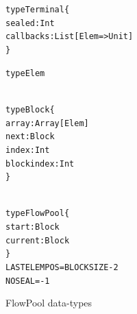 \documentclass[runningheads,a4paper]{llncs}
\begin{document}
\begin{figure}[t]

\centering

\begin{minipage}[b]{4.5 cm}
\begin{alltt}
{\scriptsize
type Terminal \{
  sealed: Int
  callbacks: List[Elem => Unit]
\}

type Elem
}
\end{alltt}
\end{minipage}
\begin{minipage}[b]{3.5 cm}
\begin{alltt}
{\scriptsize
type Block \{
  array: Array[Elem]
  next: Block
  index: Int
  blockindex: Int
\}
}
\end{alltt}
\end{minipage}
\begin{minipage}[b]{4 cm}
\begin{alltt}
{\scriptsize
type FlowPool \{
  start: Block
  current: Block
\}
LASTELEMPOS = BLOCKSIZE - 2
NOSEAL = -1
}
\end{alltt}
\end{minipage}

\caption{FlowPool data-types}
\label{f-datatypes}
\end{figure}

\setlength\linenumbersep{2pt}
\end{document}

